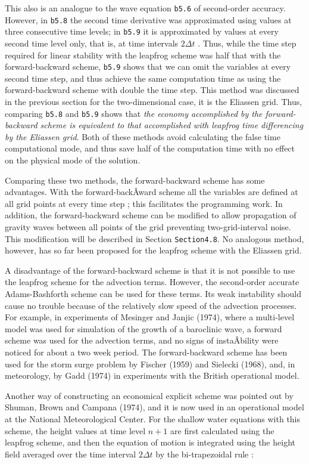 This also is an analogue to the wave equation \texttt{b5.6} of
second-order accuracy. However, in \texttt{b5.8} the second time
derivative was approximated using values at three consecutive time
levels; in \texttt{b5.9} it is approximated by values at every second
time level only, that is, at time intervals \(2\Delta t\) . Thus, while
the time step required for linear stability with the leapfrog scheme was
half that with the forward-backward scheme, \texttt{b5.9} shows that we
can omit the variables at every second time step, and thus achieve the
same computation time as using the forward-backward scheme with double
the time step. This method was discussed in the previous section for the
two-dimensional case, it is the Eliassen grid. Thus, comparing
\texttt{b5.8} and \texttt{b5.9} shows that \emph{the economy
accomplished by the forward-backward scheme is equivalent to that
accomplished with leapfrog time differencing by the Eliassen grid}. Both
of these methods avoid calculating the false time computational mode,
and thus save half of the computation time with no effect on the
physical mode of the solution.

Comparing these two methods, the forward-backward scheme has some
advantages. With the forward-backÂ­ward scheme all the variables are
defined at all grid points at every time step ; this facilitates the
programming work. In addition, the forward-backward scheme can be
modified to allow propagation of gravity waves between all points of the
grid preventing two-grid-interval noise. This modification will be
described in Section \texttt{Section4.8}. No analogous method, however,
has so far been proposed for the leapfrog scheme with the Eliassen grid.

A disadvantage of the forward-backward scheme is that it is not possible
to use the leapfrog scheme for the advection terms. However, the
second-order accurate Adams-Bashforth scheme can be used for these
terms. Its weak instability should cause no trouble because of the
relatively slow speed of the advection processes. For example, in
experiments of Mesinger and Janjic (1974), where a multi-level model was
used for simulation of the growth of a baroclinic wave, a forward scheme
was used for the advection terms, and no signs of instaÂ­bility were
noticed for about a two week period. The forward-backward scheme has
been used for the storm surge problem by Fischer (1959) and Sielecki
(1968), and, in meteorology, by Gadd (1974) in experiments with the
British operational model.

Another way of constructing an economical explicit scheme was pointed
out by Shuman, Brown and Campana (1974), and it is now used in an
operational model at the National Meteorological Center. For the shallow
water equations with this scheme, the height values at time level
\(n + 1\) are first calculated using the leapfrog scheme, and then the
equation of motion is integrated using the height field averaged over
the time interval \(2\Delta t\) by the bi-trapezoidal rule :

